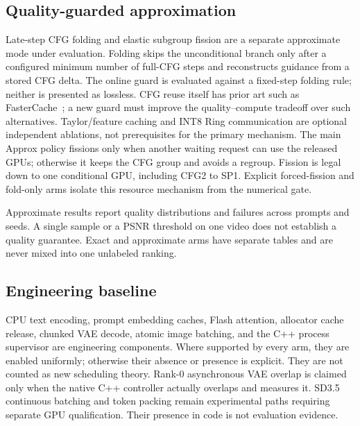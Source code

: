 \documentclass[11pt,a4paper]{article}
\begin{document}
\subsection{Quality-guarded approximation}
Late-step CFG folding and elastic subgroup fission are a separate approximate
mode under evaluation. Folding skips the unconditional branch only after a configured minimum
number of full-CFG steps and reconstructs guidance from a stored CFG delta.
The online guard is evaluated against a fixed-step folding rule; neither is
presented as lossless. CFG reuse itself has prior art such as
FasterCache~\cite{lyu2025fastercache}; a new guard must improve the quality--compute
tradeoff over such alternatives. Taylor/feature caching and INT8 Ring communication are
optional independent ablations, not prerequisites for the primary mechanism.
The main Approx policy fissions only when another waiting request can use the
released GPUs; otherwise it keeps the CFG group and avoids a regroup. Fission is
legal down to one conditional GPU, including CFG2 to SP1. Explicit forced-fission
and fold-only arms isolate this resource mechanism from the numerical gate.

Approximate results report quality distributions and failures across prompts
and seeds. A single sample or a PSNR threshold on one video does not establish
a quality guarantee. Exact and approximate arms have separate tables and are
never mixed into one unlabeled ranking.

\subsection{Engineering baseline}
CPU text encoding, prompt embedding caches, Flash attention, allocator cache
release, chunked VAE decode, atomic image batching, and the C++ process
supervisor are engineering components. Where supported by every arm, they are
enabled uniformly; otherwise their absence or presence is explicit. They are
not counted as new scheduling theory. Rank-0 asynchronous VAE overlap is
claimed only when the native C++ controller actually overlaps and measures it.
SD3.5 continuous batching and token packing remain experimental paths requiring
separate GPU qualification. Their presence in code is not evaluation evidence.
\end{document}
